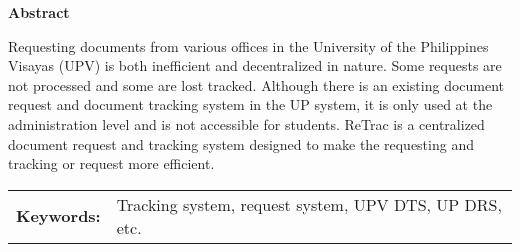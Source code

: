 \begin{center}
\textbf{Abstract}
\end{center}
\setlength{\parindent}{0pt}
Requesting documents from various offices in the University of the Philippines Visayas (UPV) is both inefficient and decentralized in nature. Some requests are not processed and some are lost tracked. Although there is an existing document request and document tracking system in the UP system, it is only used at the administration level and is not accessible for students. ReTrac is a centralized document request and tracking system designed to make the requesting and tracking or request more efficient.



\begin{tabular}{lp{4.25in}}
\hspace{-0.5em}\textbf{Keywords:}\hspace{0.25em} & Tracking system, request system, UPV DTS, UP DRS, etc.\\
\end{tabular}
